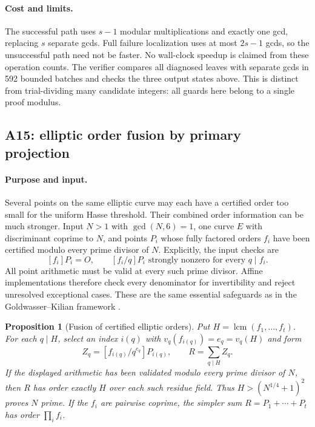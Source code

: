 \documentclass[11pt,a4paper]{article}
\newtheorem{proposition}[theorem]{Proposition}
\theoremstyle{definition}\newtheorem{definition}[theorem]{Definition}
\theoremstyle{remark}\newtheorem{remark}[theorem]{Remark}
\newcommand{\lcm}{\operatorname{lcm}}\newcommand{\isqrt}{\operatorname{isqrt}}
\begin{document}
\paragraph{Cost and limits.}
The successful path uses $s-1$ modular multiplications and exactly one
gcd, replacing $s$ separate gcds.  Full failure localization uses at most
$2s-1$ gcds, so the unsuccessful path need not be faster.  No wall-clock
speedup is claimed from these operation counts.  The verifier compares all
diagnosed leaves with separate gcds in 592 bounded batches and checks the
three output states above.  This is distinct from trial-dividing many
candidate integers: all guards here belong to a single proof modulus.

\subsection{A15: elliptic order fusion by primary projection}
\label{alg:A15}

\paragraph{Purpose and input.}
Several points on the same elliptic curve may each have a certified order
too small for the uniform Hasse threshold.  Their combined order
information can be much stronger.  Input $N>1$ with $\gcd(N,6)=1$, one curve
$E$ with discriminant coprime to $N$, and points $P_i$ whose fully factored
orders $f_i$ have been certified modulo every prime divisor of $N$.
Explicitly, the input checks are
\[
 [f_i]P_i=O,\qquad [f_i/q]P_i\text{ strongly nonzero for every }q\mid f_i.
\]
All point arithmetic must be valid at every such prime divisor.  Affine
implementations therefore check every denominator for invertibility and
reject unresolved exceptional cases.  These are the same essential
safeguards as in the Goldwasser--Kilian framework
\cite{gk,sutherland}.

\begin{proposition}[Fusion of certified elliptic orders]\label{prop:cert-ec-fusion}
Put $H=\lcm(f_1,\ldots,f_t)$.  For each $q\mid H$, select an index $i(q)$
with $v_q(f_{i(q)})=e_q=v_q(H)$ and form
\[
 Z_q=[f_{i(q)}/q^{e_q}]P_{i(q)},\qquad R=\sum_{q\mid H}Z_q.
\]
If the displayed arithmetic has been validated modulo every prime divisor
of $N$, then $R$ has order exactly $H$ over each such residue field.
Thus $H>(N^{1/4}+1)^2$ proves $N$ prime.  If the $f_i$ are pairwise
coprime, the simpler sum $R=P_1+\cdots+P_t$ has order $\prod_i f_i$.
\end{proposition}
\end{document}

